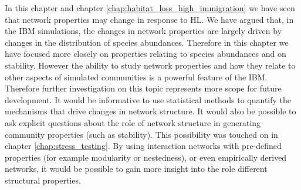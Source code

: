 In this chapter and chapter \ref{chap:habitat_loss_high_immigration} we have seen that network properties may change in response to HL. We have argued that, in the IBM simulations, the changes in network properties are largely driven by changes in the distribution of species abundances. Therefore in this chapter we have focused more closely on properties relating to species abundances and on stability. However the ability to study network properties and how they relate to other aspects of simulated communities is a powerful feature of the IBM. Therefore further investigation on this topic represents more scope for future development. It would be informative to use statistical methods to quantify the mechanisms that drive changes in network structure. It would also be possible to ask explicit questions about the role of network structure in generating community properties (such as stability). This possibility was touched on in chapter \ref{chap:stress_testing}. By using interaction networks with pre-defined properties (for example modularity or nestedness), or even empirically derived networks, it would be possible to gain more insight into the role different structural properties. 

%
%

